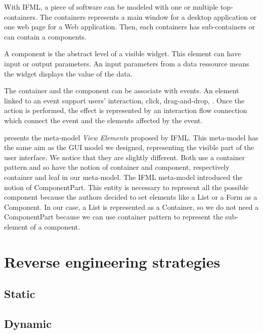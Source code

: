 \documentclass[conference]{IEEEtran}
\begin{document}
With IFML, a piece of software can be modeled with one or multiple top-containers.
The containers represents a main window for a desktop application or one web page for a Web application.
Then, each containers has sub-containers or can contain a components.

A component is the abstract level of a visible widget.
This element can have input or output parameters.
An input parameters from a data ressource means the widget displays the value of the data.

The container and the component can be associate with events.
An element linked to an event support users' interaction, \eg click, drag-and-drop, \etc.
Once the action is performed, the effect is represented by an interaction flow connection which connect the event
    and the elements affected by the event.



 presents the meta-model \textit{View Elements} proposed
    by IFML.
This meta-model has the same aim as the GUI model we designed, \ie representing the
    visible part of the user interface.
We notice that they are slightly different.
Both use a container pattern and so have the notion of container and component, 
    respectively container and leaf in our meta-model.
The IFML meta-model introduced the notion of ComponentPart.
This entity is necessary to represent all the possible component because
    the authors decided to set elements like a List or a Form as a Component.
In our case, a List is represented as a Container,
    so we do not need a ComponentPart because we can use container pattern to
    represent the sub-element of a component.

\section{Reverse engineering strategies}
\label{sec:reverseEngineering}

\subsection{Static}
\label{sec:reverseStatic}

\subsection{Dynamic}
\label{sec:reverseDynamic}
\end{document}
